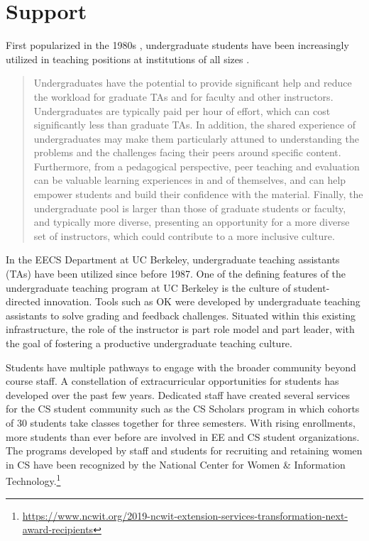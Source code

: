 \chapter{Support}
\label{chapter:support}

First popularized in the 1980s \cite{Reges:1988}, undergraduate students have been increasingly utilized in teaching positions at institutions of all sizes \cite{Roberts:1995, Reges:2003, Decker:2006, Dickson:2017, RetentionCS, Pon-Barry:2019}.
\begin{quote}
    Undergraduates have the potential to provide significant help and reduce the workload for graduate TAs and for faculty and other instructors. Undergraduates are typically paid per hour of effort, which can cost significantly less than graduate TAs. In addition, the shared experience of undergraduates may make them particularly attuned to understanding the problems and the challenges facing their peers around specific content. Furthermore, from a pedagogical perspective, peer teaching and evaluation can be valuable learning experiences in and of themselves, and can help empower students and build their confidence with the material. Finally, the undergraduate pool is larger than those of graduate students or faculty, and typically more diverse, presenting an opportunity for a more diverse set of instructors, which could contribute to a more inclusive culture. \cite{CSUndergraduateEnrollments}
\end{quote}

In the EECS Department at UC Berkeley, undergraduate teaching assistants (TAs) have been utilized since before 1987. One of the defining features of the undergraduate teaching program at UC Berkeley is the culture of student-directed innovation. Tools such as OK were developed by undergraduate teaching assistants to solve grading and feedback challenges. Situated within this existing infrastructure, the role of the instructor is part role model and part leader, with the goal of fostering a productive undergraduate teaching culture.

Students have multiple pathways to engage with the broader community beyond course staff. A constellation of extracurricular opportunities for students has developed over the past few years. Dedicated staff have created several services for the CS student community such as the CS Scholars program in which cohorts of 30 students take classes together for three semesters. With rising enrollments, more students than ever before are involved in EE and CS student organizations. The programs developed by staff and students for recruiting and retaining women in CS have been recognized by the National Center for Women \& Information Technology.\footnote{\url{https://www.ncwit.org/2019-ncwit-extension-services-transformation-next-award-recipients}}

